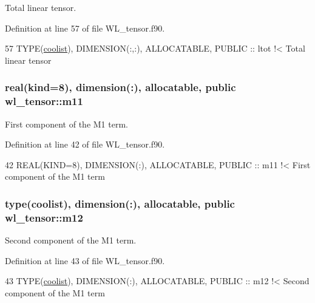 Total linear tensor. 



Definition at line 57 of file W\+L\+\_\+tensor.\+f90.


\begin{DoxyCode}
57   \textcolor{keywordtype}{TYPE}(\hyperlink{structtensor_1_1coolist}{coolist}), \textcolor{keywordtype}{DIMENSION(:,:)}, \textcolor{keywordtype}{ALLOCATABLE}, \textcolor{keywordtype}{PUBLIC} :: ltot\textcolor{comment}{  !< Total linear tensor}
\end{DoxyCode}
\subsubsection[{\texorpdfstring{m11}{m11}}]{\setlength{\rightskip}{0pt plus 5cm}real(kind=8), dimension(\+:), allocatable, public wl\+\_\+tensor\+::m11}\hypertarget{namespacewl__tensor_ac43c10a8ee5e3dd488001634e715b0ae}{}\label{namespacewl__tensor_ac43c10a8ee5e3dd488001634e715b0ae}


First component of the M1 term. 



Definition at line 42 of file W\+L\+\_\+tensor.\+f90.


\begin{DoxyCode}
42   \textcolor{keywordtype}{REAL(KIND=8)}, \textcolor{keywordtype}{DIMENSION(:)}, \textcolor{keywordtype}{ALLOCATABLE}, \textcolor{keywordtype}{PUBLIC} :: m11\textcolor{comment}{    !< First component of the M1 term}
\end{DoxyCode}
\subsubsection[{\texorpdfstring{m12}{m12}}]{\setlength{\rightskip}{0pt plus 5cm}type({\bf coolist}), dimension(\+:), allocatable, public wl\+\_\+tensor\+::m12}\hypertarget{namespacewl__tensor_a2c742f8ab1b1994e6a82a04c602d7ca9}{}\label{namespacewl__tensor_a2c742f8ab1b1994e6a82a04c602d7ca9}


Second component of the M1 term. 



Definition at line 43 of file W\+L\+\_\+tensor.\+f90.


\begin{DoxyCode}
43   \textcolor{keywordtype}{TYPE}(\hyperlink{structtensor_1_1coolist}{coolist}), \textcolor{keywordtype}{DIMENSION(:)}, \textcolor{keywordtype}{ALLOCATABLE}, \textcolor{keywordtype}{PUBLIC} :: m12\textcolor{comment}{   !< Second component of the M1 term}
\end{DoxyCode}

